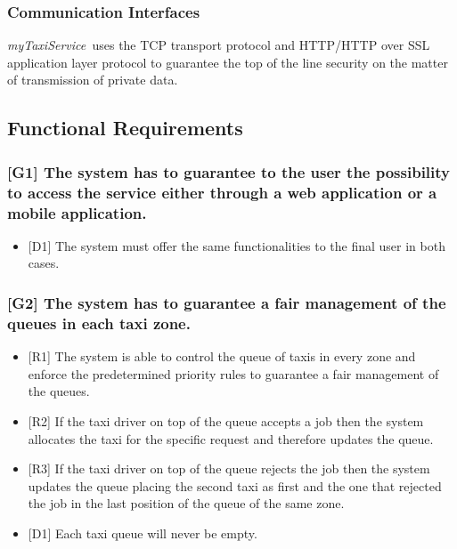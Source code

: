 \documentclass[a4paper,11pt]{report} %
\newcommand{\mts}{\mbox{\normalfont\itshape myTaxiService\ }}
\begin{document}
	
	\subsubsection{Communication Interfaces} \mts uses the TCP transport protocol and HTTP/HTTP over SSL application layer protocol to guarantee the top of the line security on the matter of transmission of private data.
	
	\subsection{Functional Requirements}
	
	\subsubsection{{[}G1{]} The system has to guarantee to the user the possibility to access the service either through a web application or a mobile application.}
	\begin{itemize}
		\item {[}D1{]} The system must offer the same functionalities to the final user in both cases.
	\end{itemize}
	
	\subsubsection{{[}G2{]} The system has to guarantee a fair management of the queues in each taxi zone.}
	\begin{itemize}
		\item {[}R1{]} The system is able to control the queue of taxis in every zone and enforce the predetermined priority rules to guarantee a fair management of the queues.
		\item {[}R2{]} If the taxi driver on top of the queue accepts a job then the system allocates the taxi for the specific request and therefore updates the queue.
		\item {[}R3{]} If the taxi driver on top of the queue rejects the job then the system updates the queue placing the second taxi as first and the one that rejected the job in the last position of the queue of the same zone.
		\item {[}D1{]} Each taxi queue will never be empty.
	\end{itemize}
		
\end{document}
